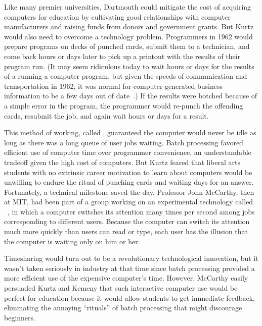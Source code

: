 Like many premier universities, Dartmouth could mitigate the cost of
acquiring computers for education by cultivating good relationships with
computer manufacturers and raising funds from donors and government
grants.
But Kurtz would also need to overcome a technology problem.
Programmers in 1962 would prepare programs on decks of punched cards,
submit them to a technician,
and come back hours or days later to pick up a printout with
the results of their program run.
(It may seem ridiculous today to wait hours or days for the results of a
running a computer program, but given the speeds of 
communication and transportation in 1962, it was normal for
computer-generated business information to be a few days out of
date~\cite{ceruzzi}.) 
If the results were botched because of a simple error in the program,
the programmer would re-punch the offending cards, resubmit the job, and
again wait hours or days for a result.

This method of working, called , guaranteed the
computer would never be idle as long as there was a long queue of user
jobs waiting.
Batch processing favored efficient use of computer time over
programmer convenience, an understandable
tradeoff given the high cost of computers.
But Kurtz feared that liberal arts students with no
extrinsic career motivation to learn about computers would be unwilling
to endure the ritual of
punching cards and waiting days for an answer.
Fortunately, a technical milestone saved the day.
Professor John McCarthy, then at MIT, had been part of a group working
on an experimental technology called
~\cite{corbato62timesharing}, in which a computer
switches its attention many times per second among jobs corresponding to
different users.
Because the computer can switch its attention much more quickly than
users can read or type, each user has the illusion that the computer
is waiting only on him or her.

Timesharing would turn out to be a revolutionary technological innovation,
but it wasn't taken seriously in industry at that time since batch
processing provided a more efficient use of the expensive computer's
time.  
However, McCarthy easily persuaded Kurtz and Kemeny that such interactive
computer use would be perfect for education because it would allow
students to get
immediate feedback, eliminating the annoying ``rituals'' of batch
processing that might discourage beginners.

